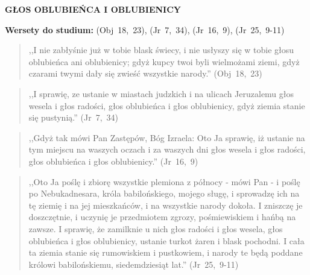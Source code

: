 \documentclass[10pt,a4paper,oneside]{article}
\begin{document}
\centerline{\textbf{\MakeUppercase{Głos Oblubieńca i Oblubienicy}}}
\begin{center}
\textbf{Wersety do studium:} (Obj~18,~23), (Jr~7,~34), (Jr~16,~9), (Jr~25,~9-11)
\end{center}
\begin{quote}
,,I nie zabłyśnie już w tobie blask świecy, i nie usłyszy się w tobie głosu oblubieńca ani oblubienicy; gdyż kupcy twoi byli wielmożami ziemi, gdyż czarami twymi dały się zwieść wszystkie narody.'' (Obj~18,~23)
\end{quote}
\begin{quote}
,,I sprawię, ze ustanie w miastach judzkich i na ulicach Jeruzalemu głos wesela i głos radości, głos oblubieńca i głos oblubienicy, gdyż ziemia stanie się pustynią.'' (Jr~7,~34)
\end{quote}
\begin{quote}
,,Gdyż tak mówi Pan Zastępów, Bóg Izraela: Oto Ja sprawię, iż ustanie na tym miejscu na waszych oczach i za waszych dni głos wesela i głos radości, głos oblubieńca i głos oblubienicy.'' (Jr~16,~9)
\end{quote}
\begin{quote}
,,Oto Ja poślę i zbiorę wszystkie plemiona z północy - mówi Pan - i poślę po Nebukadnesara, króla babilońskiego, mojego sługę, i sprowadzę ich na tę ziemię i na jej mieszkańców, i na wszystkie narody dokoła. I zniszczę je doszczętnie, i uczynię je przedmiotem zgrozy, pośmiewiskiem i hańbą na zawsze. I sprawię, że zamilknie u nich głos radości i głos wesela, głos oblubieńca i głos oblubienicy, ustanie turkot żaren i blask pochodni. I cała ta ziemia stanie się rumowiskiem i pustkowiem, i narody te będą poddane królowi babilońskiemu, siedemdziesiąt lat.'' (Jr~25,~9-11)
\end{quote}
\end{document}

